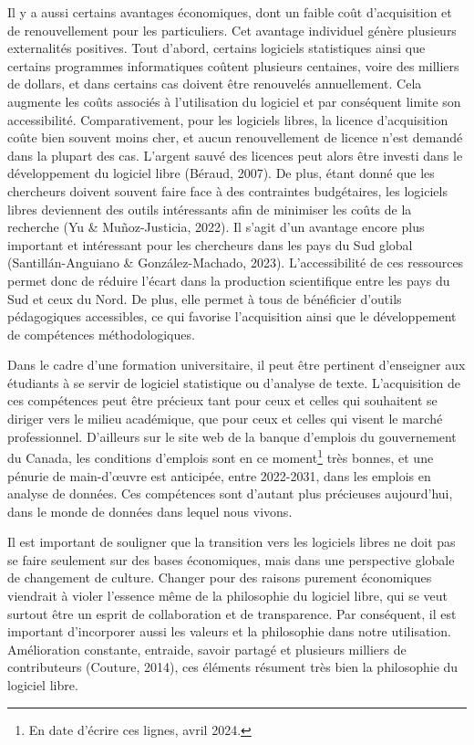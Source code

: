 \documentclass[
  letterpaper,
  DIV=11,
  numbers=noendperiod]{scrreprt}
\begin{document}
Il y a aussi certains avantages économiques, dont un faible coût
d'acquisition et de renouvellement pour les particuliers. Cet avantage
individuel génère plusieurs externalités positives. Tout d'abord,
certains logiciels statistiques ainsi que certains programmes
informatiques coûtent plusieurs centaines, voire des milliers de
dollars, et dans certains cas doivent être renouvelés annuellement. Cela
augmente les coûts associés à l'utilisation du logiciel et par
conséquent limite son accessibilité. Comparativement, pour les logiciels
libres, la licence d'acquisition coûte bien souvent moins cher, et aucun
renouvellement de licence n'est demandé dans la plupart des cas.
L'argent sauvé des licences peut alors être investi dans le
développement du logiciel libre (Béraud, 2007). De plus, étant donné que
les chercheurs doivent souvent faire face à des contraintes budgétaires,
les logiciels libres deviennent des outils intéressants afin de
minimiser les coûts de la recherche (Yu \& Muñoz-Justicia, 2022). Il
s'agit d'un avantage encore plus important et intéressant pour les
chercheurs dans les pays du Sud global (Santillán-Anguiano \&
González-Machado, 2023). L'accessibilité de ces ressources permet donc
de réduire l'écart dans la production scientifique entre les pays du Sud
et ceux du Nord. De plus, elle permet à tous de bénéficier d'outils
pédagogiques accessibles, ce qui favorise l'acquisition ainsi que le
développement de compétences méthodologiques.

Dans le cadre d'une formation universitaire, il peut être pertinent
d'enseigner aux étudiants à se servir de logiciel statistique ou
d'analyse de texte. L'acquisition de ces compétences peut être précieux
tant pour ceux et celles qui souhaitent se diriger vers le milieu
académique, que pour ceux et celles qui visent le marché professionnel.
D'ailleurs sur le site web de la banque d'emplois du gouvernement du
Canada, les conditions d'emplois sont en ce moment\footnote{En date
  d'écrire ces lignes, avril 2024.} très bonnes, et une pénurie de
main-d'œuvre est anticipée, entre 2022-2031, dans les emplois en analyse
de données. Ces compétences sont d'autant plus précieuses aujourd'hui,
dans le monde de données dans lequel nous vivons.

Il est important de souligner que la transition vers les logiciels
libres ne doit pas se faire seulement sur des bases économiques, mais
dans une perspective globale de changement de culture. Changer pour des
raisons purement économiques viendrait à violer l'essence même de la
philosophie du logiciel libre, qui se veut surtout être un esprit de
collaboration et de transparence. Par conséquent, il est important
d'incorporer aussi les valeurs et la philosophie dans notre utilisation.
Amélioration constante, entraide, savoir partagé et plusieurs milliers
de contributeurs (Couture, 2014), ces éléments résument très bien la
philosophie du logiciel libre.
\end{document}
